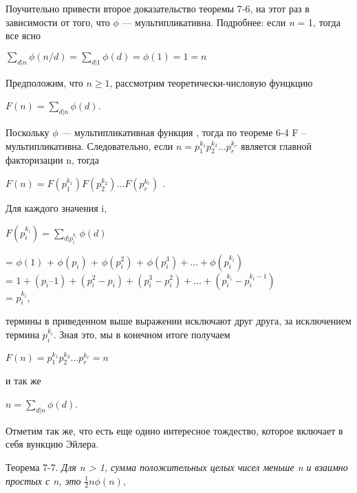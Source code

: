 \documentclass[12pt]{article}
\begin{document}
	
	Поучительно привести второе доказательство теоремы 7-6, на этот раз в зависимости от того, что  $\phi$ — мультипликативна. Подробнее: если \textit{n} = 1,  тогда все ясно 
	
	\begin{center}
		$\sum_{d|n}\phi(n/d) = \sum_{d|1}\phi(d) = \phi(1) = 1 = \textit{n}$	
	\end{center}
	
	
	Предположим, что $n \geq 1$, рассмотрим теоретически-числовую фунцкцию
	
	\begin{center}
		$F(n) = \sum_{d|n}\phi(d)$.	
	\end{center}
	
	
	Поскольку $\phi$ — мультипликативная функция , тогда по теореме 6-4 F – мультипликативна. Следовательно, если $n = p_1^{k_{1}}p_2^{k_{2}} … p_r^{k_{r}}$  является главной факторизации n, тогда 
	
	\begin{center}
		$F(n) = F(p_1^{k_{1}})F(p_2^{k_{2}})...F(p_r^{k_{r}})$ .	
	\end{center}
	
	
	Для каждого значения i,
	
		$F(p_i^{k_{i}}) =  \sum_{d|p_i^{k_{i}}}\phi(d)$	
	 
	\begin{center}
			= $\phi(1)$ + $\phi(p_i)$ + $\phi(p_i^2)$ + $\phi(p_i^3)+ … + \phi(p_i^{k_{i}})$ \\
			= $1 + (p_i – 1) + (p_i^2  - p_i) + (p_i^3  - p_i^2 ) + … + (p_i^{k_{i}}  - p_i^{k_{i} - 1})$ \\
			= $p_i^{k_{i}}$,	
	\end{center}

	
	термины в приведенном выше выражении исключают друг друга, за исключением термина  $p_i^{k_{i}}$. Зная это, мы в конечном итоге получаем
	
	\begin{center}
		$F(n) = p_1^{k_{1}}p_2^{k_{2}}...p_r^{k_{r}} = \textit{n}$	
	\end{center}
	
	
	и так же 
	
	\begin{center}
		$n = \sum_{d|n}\phi(d)$.	
	\end{center}
	
	
	Отметим так же, что есть еще одино интересное тождество, которое включает в себя вункцию Эйлера.
	
	Теорема 7-7. \textit{Для  n > 1, сумма положительных целых чисел меньше n и взаимно простых с n, это} $\frac{1}{2}n\phi(n)$,
	
\end{document}
